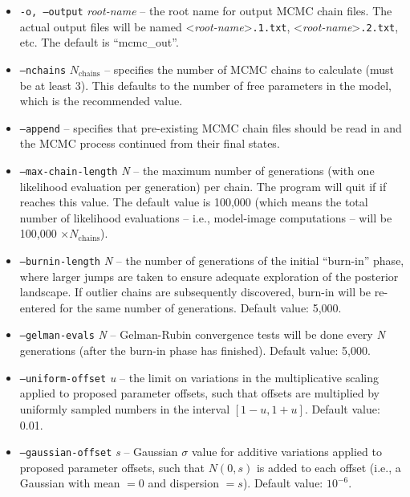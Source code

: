 \documentclass[10pt,a4paper,article]{memoir}
\begin{document}
\begin{itemize}
\item \texttt{-o, --output} \textit{root-name} -- the root name for
output MCMC chain files. The actual output files will be named <\textit{root-name}>\texttt{.1.txt},
<\textit{root-name}>\texttt{.2.txt}, etc. The default is ``mcmc\_out''.

\item \texttt{--nchains} $N_{\textrm{chains}}$ -- specifies the number
of MCMC chains to calculate (must be at least 3). This defaults to the
number of free parameters in the model, which is the recommended value.

\item \texttt{--append} -- specifies that pre-existing MCMC chain files should be
read in and the MCMC process continued from their final states.

\item \texttt{--max-chain-length} \textit{N} -- the maximum number of
generations (with one likelihood evaluation per generation) per chain.
The program will quit if if reaches this value. The default value is
100,000 (which means the total number of likelihood evaluations -- i.e.,
model-image computations -- will be 100,000 $\times
N_{\mathrm{chains}}$).

\item \texttt{--burnin-length} \textit{N} -- the number of generations of the initial ``burn-in''
phase, where larger jumps are taken to ensure adequate exploration of the posterior
landscape. If outlier chains are subsequently discovered, burn-in will be re-entered
for the same number of generations. Default value: 5,000.

\item \texttt{--gelman-evals} \textit{N} -- Gelman-Rubin convergence
tests will be done every \textit{N} generations (after the burn-in phase
has finished). Default value: 5,000.

\item \texttt{--uniform-offset} \textit{u} -- the limit on variations in the multiplicative
scaling applied to proposed parameter offsets, such that offsets are multiplied
by uniformly sampled numbers in the interval $[1 - u, 1 + u]$. Default value: 0.01.

\item \texttt{--gaussian-offset} \textit{s} -- Gaussian $\sigma$ value for additive
variations applied to proposed parameter offsets, such that $N(0,s)$ is added to
each offset (i.e., a Gaussian with mean $= 0$ and dispersion $= s$). Default value: $10^{-6}$.

\end{itemize}
\end{document}
